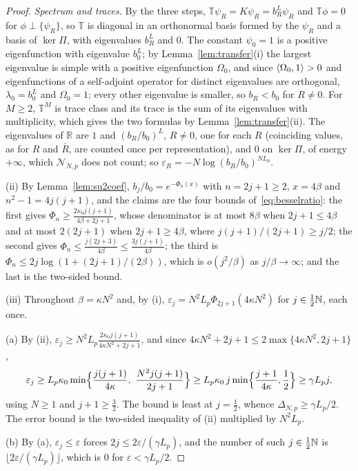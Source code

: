 \begin{proof}
\emph{Spectrum and traces.} By the three steps, $\mathbb T\psi_R=K\psi_R=
b_R^L\psi_R$ and $\mathbb T\phi=0$ for $\phi\perp\{\psi_R\}$, so $\mathbb T$
is diagonal in an orthonormal basis formed by the $\psi_R$ and a basis of
$\ker\Pi$, with eigenvalues $b_R^L$ and $0$. The constant $\psi_0=1$ is a
positive eigenfunction with eigenvalue $b_0^L$; by Lemma~\ref{lem:transfer}(i)
the largest eigenvalue is simple with a positive eigenfunction $\Omega_0$, and
since $\langle \Omega_0,1\rangle>0$ and eigenfunctions of a self-adjoint operator for
distinct eigenvalues are orthogonal, $\lambda_0=b_0^L$ and $\Omega_0=1$; every
other eigenvalue is smaller, so $b_R<b_0$ for $R\ne0$. For $M\ge2$,
$\mathbb T^M$ is trace class and its trace is the sum of its eigenvalues with
multiplicity, which gives the two formulas by Lemma~\ref{lem:transfer}(ii).
The eigenvalues of $\mathbb R$ are $1$ and $(b_R/b_0)^L$, $R\ne0$, one for
each $R$ (coinciding values, as for $R$ and $\bar R$, are counted once per
representation), and $0$ on $\ker\Pi$, of energy $+\infty$, which
$\mathcal N_{N,p}$ does not count; so $\varepsilon_R=-N\log(b_R/b_0)^{NL_p}$.

(ii) By Lemma~\ref{lem:su2coef}, $b_j/b_0=e^{-\Phi_n(x)}$ with $n=2j+1\ge2$,
$x=4\beta$ and $n^2-1=4j(j+1)$, and the claims are the four bounds
of~\eqref{eq:besselratio}: the first gives $\Phi_n\ge\frac{2\kappa_0j(j+1)}
{4\beta+2j+1}$, whose denominator is at most $8\beta$ when $2j+1\le4\beta$ and
at most $2(2j+1)$ when $2j+1\ge4\beta$, where $j(j+1)/(2j+1)\ge j/2$; the
second gives $\Phi_n\le\frac{j(2j+3)}{4\beta}\le\frac{3j(j+1)}{4\beta}$; the
third is $\Phi_n\le2j\log(1+(2j+1)/(2\beta))$, which is $o(j^2/\beta)$ as
$j/\beta\to\infty$; and the last is the two-sided bound.

(iii) Throughout $\beta=\kappa N^2$ and, by (i), $\varepsilon_j=N^2L_p
\Phi_{2j+1}(4\kappa N^2)$ for $j\in\frac12\mathbb{N}$, each once.

(a) By (ii), $\varepsilon_j\ge N^2L_p\frac{2\kappa_0j(j+1)}{4\kappa N^2+2j+1}$,
and since $4\kappa N^2+2j+1\le2\max\{4\kappa N^2,2j+1\}$,
\[
\varepsilon_j\ge L_p\kappa_0\min\Bigl\{\frac{j(j+1)}{4\kappa},\ \frac{N^2j(j+1)}
{2j+1}\Bigr\}\ge L_p\kappa_0\,j\min\Bigl\{\frac{j+1}{4\kappa},\frac12\Bigr\}
\ge\gamma L_pj,
\]
using $N\ge1$ and $j+1\ge\frac32$. The bound is least at $j=\frac12$, whence
$\Delta_{N,p}\ge\gamma L_p/2$. The error bound is the two-sided inequality of
(ii) multiplied by $N^2L_p$.

(b) By (a), $\varepsilon_j\le\varepsilon$ forces $2j\le2\varepsilon/
(\gamma L_p)$, and the number of such $j\in\frac12\mathbb{N}$ is $\lfloor2\varepsilon
/(\gamma L_p)\rfloor$, which is $0$ for $\varepsilon<\gamma L_p/2$.


\end{proof}
